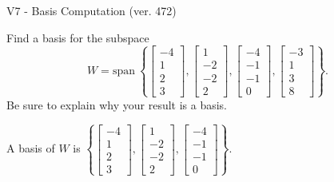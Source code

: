 \begin{exercise}
  \begin{exerciseTitle}V7 - Basis Computation (ver. 472)\end{exerciseTitle}
  \begin{exerciseStatement}
    Find a basis for the subspace 
\[W=\mathrm{span}\ \left\{\left[\begin{array}{r}
-4 \\
1 \\
2 \\
3
\end{array}\right] , \left[\begin{array}{r}
1 \\
-2 \\
-2 \\
2
\end{array}\right] , \left[\begin{array}{r}
-4 \\
-1 \\
-1 \\
0
\end{array}\right] , \left[\begin{array}{r}
-3 \\
1 \\
3 \\
8
\end{array}\right]\right\}.\]
 Be sure to explain why your result is a basis.


  \end{exerciseStatement}
  \begin{exerciseAnswer}
   A basis of \(W\) is  \(\left\{\left[\begin{array}{r}
-4 \\
1 \\
2 \\
3
\end{array}\right] , \left[\begin{array}{r}
1 \\
-2 \\
-2 \\
2
\end{array}\right] , \left[\begin{array}{r}
-4 \\
-1 \\
-1 \\
0
\end{array}\right]\right\}\).
  


  \end{exerciseAnswer}
\end{exercise}